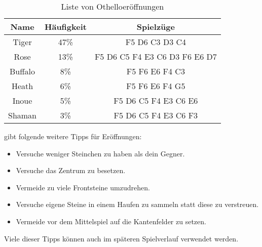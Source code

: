 \begin{table}[h]
  \centering
  \begin{tabular}{| c | c | c |}
    \hline
     Name & Häufigkeit & Spielzüge \\ \hline
     Tiger  &   47\%   & F5 D6 C3 D3 C4 \\ \hline
     Rose &   13\%   & F5 D6 C5 F4 E3 C6 D3 F6 E6 D7 \\ \hline
     Buffalo &  8\%    & F5 F6 E6 F4 C3 \\ \hline
     Heath  &  6\%    &  F5 F6 E6 F4 G5 \\ \hline
     Inoue &   5\%   &  F5 D6 C5 F4 E3 C6 E6\\ \hline
     Shaman &   3\%   & F5 D6 C5 F4 E3 C6 F3 \\ \hline
  \end{tabular}
  \caption{Liste von Othelloeröffnungen \cite{Ortiz.}}
  \label{tab:eroeffnungen}
\end{table}
\cite{Ortiz.} gibt folgende weitere Tipps für Eröffnungen:
\begin{itemize}
\item Versuche weniger Steinchen zu haben als dein Gegner.
\item Versuche das Zentrum zu besetzen.
\item Vermeide zu viele Frontsteine umzudrehen.
\item Versuche eigene Steine in einem Haufen zu sammeln statt diese zu verstreuen.
\item Vermeide vor dem Mittelspiel auf die Kantenfelder zu setzen.
\end{itemize}
Viele dieser Tipps können auch im späteren Spielverlauf verwendet werden.
